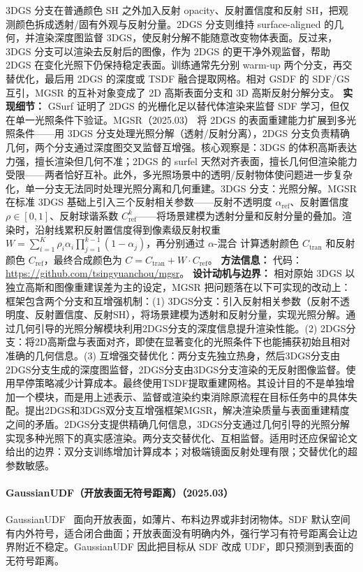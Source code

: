 3DGS 分支在普通颜色 SH 之外加入反射 opacity、反射置信度和反射 SH，把观测颜色拆成透射/固有外观与反射分量。2DGS 分支则维持 surface-aligned 的几何，并渲染深度图监督 3DGS，使反射分解不能随意改变物体表面。反过来，3DGS 分支可以渲染去反射后的图像，作为 2DGS 的更干净外观监督，帮助 2DGS 在变化光照下仍保持稳定表面。训练通常先分别 warm-up 两个分支，再交替优化，最后用 2DGS 的深度或 TSDF 融合提取网格。相对 GSDF 的 SDF/GS 互引，MGSR 的互补对象变成了 2D 高斯表面分支和 3D 高斯反射分解分支。
\textbf{实现细节：} GSurf 证明了 2DGS 的光栅化足以替代体渲染来监督 SDF 学习，但仅在单一光照条件下验证。MGSR（2025.03） 将 2DGS 的表面重建能力扩展到多光照条件——用 3DGS 分支处理光照分解（透射/反射分离），2DGS 分支负责精确几何，两个分支通过深度图交叉监督互增强。核心观察是：3DGS 的体积高斯表达力强，擅长渲染但几何不准；2DGS 的 surfel 天然对齐表面，擅长几何但渲染能力受限——两者恰好互补。此外，多光照场景中的透明/反射物体使问题进一步复杂化，单一分支无法同时处理光照分离和几何重建。3DGS 分支：光照分解。MGSR 在标准 3DGS 基础上引入三个反射相关参数——反射不透明度 $\alpha_{\mathrm{ref}}$、反射置信度 $\rho \in [0,1]$、反射球谐系数 $C_{\mathrm{ref}}^k$——将场景建模为透射分量和反射分量的叠加。渲染时，沿射线累积反射置信度得到像素级反射权重 $W = \sum_{i=1}^K \rho_i \alpha_i \prod_{j=1}^{k-1}(1-\alpha_j)$，再分别通过 $\alpha$-混合 计算透射颜色 $C_{\mathrm{tran}}$ 和反射颜色 $C_{\mathrm{ref}}$，最终合成颜色为 $C = C_{\mathrm{tran}} + W \cdot C_{\mathrm{ref}}$。
\textbf{方法信息：} 代码：\url{https://github.com/tsingyuanchou/mgsr}。
\textbf{设计动机与边界：} 相对原始 3DGS 以独立高斯和图像重建误差为主的设定，MGSR 把问题落在以下可实现的改动上：框架包含两个分支和互增强机制：(1) 3DGS分支：引入反射相关参数（反射不透明度、反射置信度、反射SH），将场景建模为透射和反射分量，实现光照分解。通过几何引导的光照分解模块利用2DGS分支的深度信息提升渲染性能。(2) 2DGS分支：将2D高斯盘与表面对齐，即使在显著变化的光照条件下也能捕获初始且相对准确的几何信息。(3) 互增强交替优化：两分支先独立热身，然后3DGS分支由2DGS分支生成的深度图监督，2DGS分支由3DGS分支渲染的无反射图像监督。使用早停策略减少计算成本。最终使用TSDF提取重建网格。其设计目的不是单独增加一个模块，而是用上述表示、监督或渲染约束消除原流程在目标任务中的具体失配。提出2DGS和3DGS双分支互增强框架MGSR，解决渲染质量与表面重建精度之间的矛盾。2DGS分支提供精确几何信息，3DGS分支通过几何引导的光照分解实现多种光照下的真实感渲染。两分支交替优化、互相监督。适用时还应保留论文给出的边界：双分支训练增加计算成本；对极端镜面反射处理有限；交替优化的超参数敏感。
\paragraph{GaussianUDF（开放表面无符号距离）（2025.03）}
GaussianUDF~\cite{2503_19458} 面向开放表面，如薄片、布料边界或非封闭物体。SDF 默认空间有内外符号，适合闭合曲面；开放表面没有明确内外，强行学习有符号距离会让边界附近不稳定。GaussianUDF 因此把目标从 SDF 改成 UDF，即只预测到表面的无符号距离。


